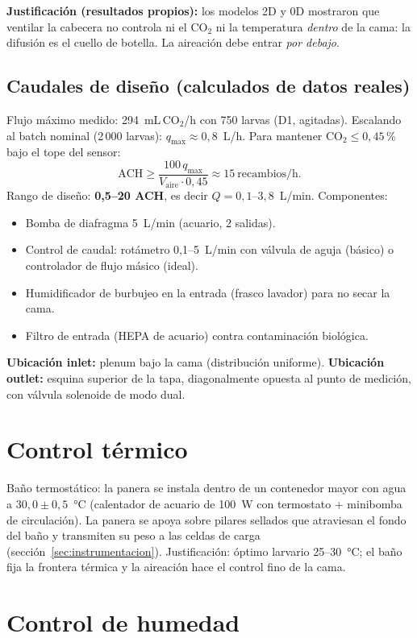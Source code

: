 \documentclass[11pt,a4paper]{article}
\begin{document}
\textbf{Justificación (resultados propios):} los modelos 2D y 0D
mostraron que ventilar la cabecera no controla ni el CO$_2$ ni la
temperatura \emph{dentro} de la cama: la difusión es el cuello de
botella. La aireación debe entrar \emph{por debajo}.

\subsection{Caudales de diseño (calculados de datos reales)}
Flujo máximo medido: 294~mL\,CO$_2$/h con 750 larvas (D1, agitadas).
Escalando al batch nominal (2\,000 larvas): $q_\text{max}\approx0{,}8$~L/h.
Para mantener CO$_2\leq0{,}45$\,\% bajo el tope del sensor:
\[
  \text{ACH} \geq \frac{100\,q_\text{max}}{V_\text{aire}\cdot 0{,}45}
  \approx 15~\text{recambios/h}.
\]
Rango de diseño: \textbf{0{,}5--20 ACH}, es decir
$Q = 0{,}1$--$3{,}8$~L/min. Componentes:
\begin{itemize}
  \item Bomba de diafragma 5~L/min (acuario, 2 salidas).
  \item Control de caudal: rotámetro 0{,}1--5~L/min con válvula
        de aguja (básico) o controlador de flujo másico (ideal).
  \item Humidificador de burbujeo en la entrada (frasco lavador)
        para no secar la cama.
  \item Filtro de entrada (HEPA de acuario) contra contaminación biológica.
\end{itemize}
\textbf{Ubicación inlet:} plenum bajo la cama (distribución uniforme).
\textbf{Ubicación outlet:} esquina superior de la tapa, diagonalmente
opuesta al punto de medición, con válvula solenoide de modo dual.

\section{Control térmico}

Baño termostático: la panera se instala dentro de un contenedor mayor
con agua a $30{,}0\pm0{,}5$~°C (calentador de acuario de 100~W con
termostato + minibomba de circulación). La panera se apoya sobre
pilares sellados que atraviesan el fondo del baño y transmiten su peso
a las celdas de carga (sección~\ref{sec:instrumentacion}).
Justificación: óptimo larvario 25--30~°C; el baño fija la frontera
térmica y la aireación hace el control fino de la cama.

\section{Control de humedad}
\end{document}
